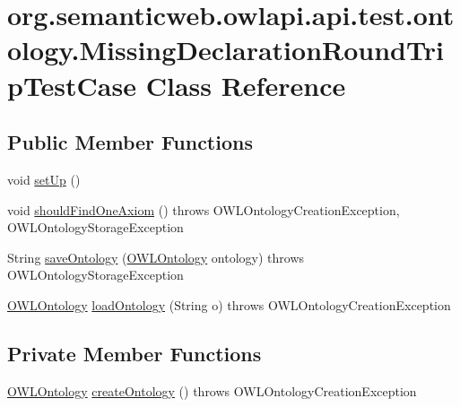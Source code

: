 \hypertarget{classorg_1_1semanticweb_1_1owlapi_1_1api_1_1test_1_1ontology_1_1_missing_declaration_round_trip_test_case}{\section{org.\-semanticweb.\-owlapi.\-api.\-test.\-ontology.\-Missing\-Declaration\-Round\-Trip\-Test\-Case Class Reference}
\label{classorg_1_1semanticweb_1_1owlapi_1_1api_1_1test_1_1ontology_1_1_missing_declaration_round_trip_test_case}
}
\subsection*{Public Member Functions}
\begin{DoxyCompactItemize}
\item 
void \hyperlink{classorg_1_1semanticweb_1_1owlapi_1_1api_1_1test_1_1ontology_1_1_missing_declaration_round_trip_test_case_a11198dd293451ab4cf14d415f374ae4e}{set\-Up} ()
\item 
void \hyperlink{classorg_1_1semanticweb_1_1owlapi_1_1api_1_1test_1_1ontology_1_1_missing_declaration_round_trip_test_case_a29e49cdea8dcdf2f7df6c2d9a7b48a0f}{should\-Find\-One\-Axiom} ()  throws O\-W\-L\-Ontology\-Creation\-Exception,             O\-W\-L\-Ontology\-Storage\-Exception 
\item 
String \hyperlink{classorg_1_1semanticweb_1_1owlapi_1_1api_1_1test_1_1ontology_1_1_missing_declaration_round_trip_test_case_ae4337fcc0749946ebb9466d3fe908b7f}{save\-Ontology} (\hyperlink{interfaceorg_1_1semanticweb_1_1owlapi_1_1model_1_1_o_w_l_ontology}{O\-W\-L\-Ontology} ontology)  throws O\-W\-L\-Ontology\-Storage\-Exception 
\item 
\hyperlink{interfaceorg_1_1semanticweb_1_1owlapi_1_1model_1_1_o_w_l_ontology}{O\-W\-L\-Ontology} \hyperlink{classorg_1_1semanticweb_1_1owlapi_1_1api_1_1test_1_1ontology_1_1_missing_declaration_round_trip_test_case_ad1e952812dea3e19a4b61544cc0af773}{load\-Ontology} (String o)  throws O\-W\-L\-Ontology\-Creation\-Exception 
\end{DoxyCompactItemize}
\subsection*{Private Member Functions}
\begin{DoxyCompactItemize}
\item 
\hyperlink{interfaceorg_1_1semanticweb_1_1owlapi_1_1model_1_1_o_w_l_ontology}{O\-W\-L\-Ontology} \hyperlink{classorg_1_1semanticweb_1_1owlapi_1_1api_1_1test_1_1ontology_1_1_missing_declaration_round_trip_test_case_aed6ca734582ae64f221ced6ed50a7522}{create\-Ontology} ()  throws O\-W\-L\-Ontology\-Creation\-Exception 
\end{DoxyCompactItemize}


